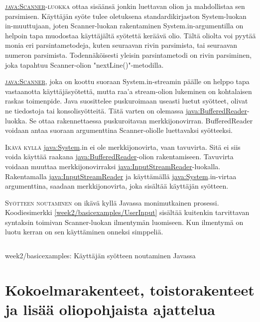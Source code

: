 \documentclass[openany]{book}
\newcommand{\newthought}[1]{\smallskip\textsc{#1}}
\newcommand{\java}[1]{\underline{\gls{java:#1}}}
\newcommand{\code}[3]{
	\begin{listing}
		\linespread{0.85}
		\inputminted{java}{OhjelmointiopasEsimerkit/src/#1/#2.java}
		\caption{#1: #3}
		\label{#1/#2}
	\end{listing}
}
\begin{document}
\newthought{\java{Scanner}-luokka} ottaa sisäänsä jonkin luettavan olion ja mahdollistaa sen
parsimisen. Käyttäjän syöte tulee oletuksena standardikirjaston System-luokan in-muuttujaan,
joten Scanner-luokan rakentaminen System.in-argumentilla on helpoin tapa muodostaa käyttäjältä
syötettä keräävä olio. Tältä oliolta voi pyytää monia eri parsintametodeja, kuten seuraavan rivin
parsimista, tai seuraavan numeron parsimista. Todennäköisesti yleisin parsintametodi on rivin
parsiminen, joka tapahtuu Scanner-olion "nextLine()"-metodilla.

\newthought{\java{Scanner}}, joka on koottu suoraan System.in-streamin
päälle on helppo tapa vastaanotta käyttäjäsyötettä, mutta raa'a stream-olion lukeminen on
kohtalaisen raskas toimenpide. Java suosittelee puskuroimaan useasti luetut syötteet, olivat ne
tiedostoja tai konsolisyötteitä. Tätä varten on olemassa \java{BufferedReader}-luokka. Se ottaa
rakennettaessa puskuroitavan merkkijonovirran. BufferedReader voidaan antaa suoraan argumenttina
Scanner-oliolle luettavaksi syötteeksi.

\newthought{Ikävä kyllä} \java{System}.in ei ole merkkijonovirta, vaan tavuvirta. Sitä ei siis
voida käyttää raakana \java{BufferedReader}-olion rakentamiseen. Tavuvirta voidaan muuttaa
merkkijonovirraksi \java{InputStreamReader}-luokalla. Rakentamalla \java{InputStreamReader}
ja käyttämällä \java{System}.in-virtaa argumenttina, saadaan merkkijonovirta, joka sisältää
käyttäjän syötteen.

\newthought{Syötteen noutaminen} on ikävä kyllä Javassa monimutkainen prosessi. Koodiesimerkki
\ref{week2/basicexamples/UserInput} sisältää kuitenkin tarvittavan syntaksin toimivan
Scanner-luokan ilmentymän luomiseen. Kun ilmentymä on luotu kerran on sen käyttäminen onneksi
simppeliä.

\code{week2/basicexamples}{UserInput}{Käyttäjän syötteen noutaminen Javassa}


\chapter{Kokoelmarakenteet, toistorakenteet ja lisää oliopohjaista ajattelua}
\label{perusteet2}
\end{document}
